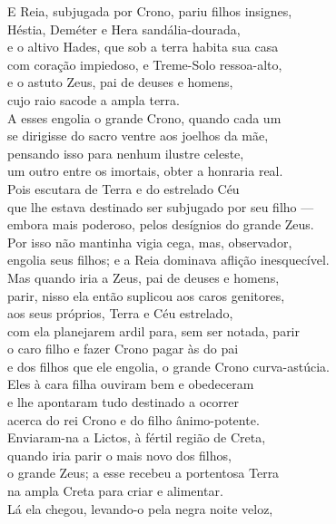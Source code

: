\begin{pages}
\begin{Rightside}
E Reia, subjugada por Crono, pariu filhos insignes,\\
Héstia, Deméter e Hera sandália-dourada,\\
e o altivo Hades, que sob a terra habita sua casa \\
com coração impiedoso, e Treme-Solo ressoa-alto,\\
e o astuto Zeus, pai de deuses e homens,\\
cujo raio sacode a ampla terra.\\
A esses engolia o grande Crono, quando cada um\\
se dirigisse do sacro ventre aos joelhos da mãe, \\
pensando isso para nenhum ilustre celeste,\\
um outro entre os imortais, obter a honraria real.\\
Pois escutara de Terra e do estrelado Céu\\
que lhe estava destinado ser subjugado por seu filho ---\\
embora mais poderoso, pelos desígnios do grande Zeus. \\
Por isso não mantinha vigia cega, mas, observador,\\
engolia seus filhos; e a Reia dominava aflição inesquecível.\\
Mas quando iria a Zeus, pai de deuses e homens,\\
parir, nisso ela então suplicou aos caros genitores,\\
aos seus próprios, Terra e Céu estrelado, \\
com ela planejarem ardil para, sem ser notada, parir\\
o caro filho e fazer Crono pagar às  do pai\\
e dos filhos que ele engolia, o grande Crono curva-astúcia.\\
Eles à cara filha ouviram bem e obedeceram\\
e lhe apontaram tudo destinado a ocorrer \\
acerca do rei Crono e do filho ânimo-potente.\\
Enviaram-na a Lictos, à fértil região de Creta,\\
quando iria parir o mais novo dos filhos,\\
o grande Zeus; a esse recebeu a portentosa Terra\\
na ampla Creta para criar e alimentar. \\
Lá ela chegou, levando-o pela negra noite veloz,\\

\end{Rightside}
\end{pages}
